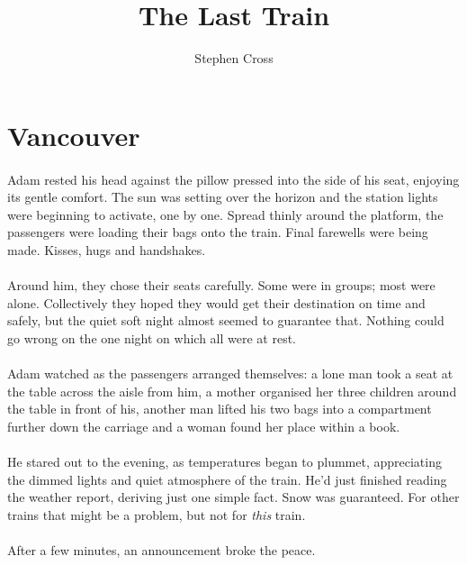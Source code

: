 \documentclass{article}
\title{The Last Train}
\author{Stephen Cross}
\date{}
\begin{document}
\maketitle

\section{Vancouver}

\paragraph{}
Adam rested his head against the pillow pressed into the side of his seat, enjoying its gentle comfort. The sun was setting over the horizon and the station lights were beginning to activate, one by one. Spread thinly around the platform, the passengers were loading their bags onto the train. Final farewells were being made. Kisses, hugs and handshakes.

\paragraph{}
Around him, they chose their seats carefully. Some were in groups; most were alone. Collectively they hoped they would get their destination on time and safely, but the quiet soft night almost seemed to guarantee that. Nothing could go wrong on the one night on which all were at rest.

\paragraph{}
Adam watched as the passengers arranged themselves: a lone man took a seat at the table across the aisle from him, a mother organised her three children around the table in front of his, another man lifted his two bags into a compartment further down the carriage and a woman found her place within a book.

\paragraph{}
He stared out to the evening, as temperatures began to plummet, appreciating the dimmed lights and quiet atmosphere of the train. He'd just finished reading the weather report, deriving just one simple fact. Snow was guaranteed. For other trains that might be a problem, but not for \emph{this} train.

\paragraph{}
After a few minutes, an announcement broke the peace.
\end{document}
